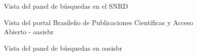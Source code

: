 \begin{figure}[!ht]
	\centering
    \caption{Vista del panel de búsquedas en el SNRD} %
    \label{snrd-2}
\end{figure}

\begin{figure}[!ht]
	\centering
    \caption{Vista del portal Brasileño de Publicaciones Científicas y Acceso Abierto - oasisbr} %
    \label{oasisbr-1}
\end{figure}

\begin{figure}[!ht]
	\centering
    \caption{Vista del panel de búsquedas en oasisbr} %
    \label{oasisbr-2}
\end{figure}


